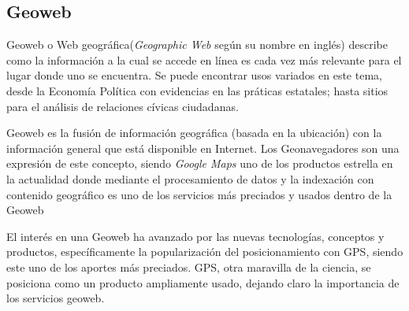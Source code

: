\subsection{Geoweb}\label{sec:geoweb}

Geoweb o Web geográfica(\emph{Geographic Web} según su nombre en inglés)
describe como la información a la cual se accede en línea es cada vez más
relevante para el lugar donde uno se encuentra. Se puede encontrar usos
variados en este tema, desde la Economía Política con evidencias en las
práticas estatales\cite{leszczynski2012}; hasta sitios para el análisis
de relaciones cívicas ciudadanas\cite{johnson2015}.

Geoweb es la fusión de información geográfica (basada en la ubicación) con la
información general que está disponible en Internet. Los Geonavegadores son
una expresión de este concepto, siendo \emph{Google Maps} uno de los productos
estrella en la actualidad donde mediante el procesamiento de datos y la
indexación con contenido geográfico es uno de los servicios más preciados y
usados dentro de la Geoweb

El interés en una Geoweb ha avanzado por las nuevas tecnologías,
conceptos y productos, específicamente la popularización del posicionamiento
con GPS, siendo este uno de los aportes más preciados. GPS, otra maravilla de
la ciencia, se posiciona como un producto ampliamente usado, dejando claro la
importancia de los servicios geoweb.

\newpage
